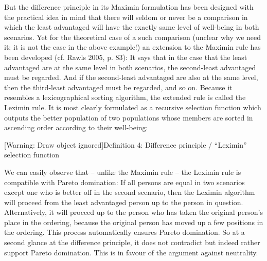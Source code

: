  But the difference principle in its Maximin formulation has been designed with the practical idea in mind that there will seldom or never be a comparison in which the least advantaged will have the exactly same level of well-being in both scenarios. Yet for the theoretical case of a such comparison (unclear why we need it; it is not the case in the above example!) an extension to the Maximin rule has been developed (cf. \label{ref:RNDsnmRiHk1LE}Rawls 2005, p. 83): It says that in the case that the least advantaged are at the same level in both scenarios, the second-least advantaged must be regarded. And if the second-least advantaged are also at the same level, then the third-least advantaged must be regarded, and so on. Because it resembles a lexicographical sorting algorithm, the extended rule is called the Leximin rule. It is most clearly formulated as a recursive selection function which outputs the better population of two populations whose members are sorted in ascending order according to their well-being:  

 [Warning: Draw object ignored]Definition 4: Difference principle / “Leximin” selection function  
\begin{comment}
 \begin{flushleft} \tablefirsthead{} \tablehead{} \tabletail{} \tablelasttail{} \begin{supertabular}{m{1.546cm}m{1.8369999cm}m{1.0439999cm}m{0.274cm}m{3.9009998cm}m{5.4370003cm}} ~  & ~  & ~  & ~  & u(s1) {\textgreater} u(t1) & \{S\}\\ lexiMin( & S=s1...sn, 

 T=t1...tn & ) = & ~  & u(t1) {\textgreater} u(s1) & \{T\}\\  &  &  & ~  & S = T = ${\emptyset}$ & \{S, T\}\\ \multicolumn{2}{m{3.583cm}}{with: 

 u(s1) ${\leq}$ … ${\leq}$ u(sn) u(t1) \ ${\leq}$ … ${\leq}$ u(tn)} & ~  & ~  & u(t1) = u(s1) & lexiMin(s2...sn, t2...tn)\\ \end{supertabular} \end{flushleft} 
\end{comment}
 \bigskip 

 We can easily observe that – unlike the Maximin rule – the Leximin rule is compatible with Pareto domination: If all persons are equal in two scenarios except one who is better off in the second scenario, then the Leximin algorithm will proceed from the least advantaged person up to the person in question. Alternatively, it will proceed up to the person who has taken the original person’s place in the ordering, because the original person has moved up a few positions in the ordering. This process automatically ensures Pareto domination. So at a second glance at the difference principle, it does not contradict but indeed rather support Pareto domination. This is in favour of the argument against neutrality.  

